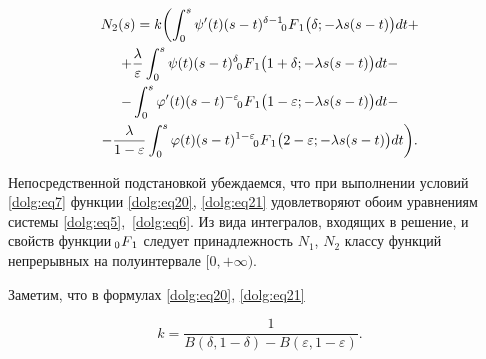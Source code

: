 \begin{multline}

N_2(s) = k\biggl( \int _0^s \psi'(t) (s-t)^{\delta-1}  \,\,

F_{\hspace{-4mm}0 \hspace{3mm}1} \bigl(\delta;-\lambda s (s-t)\bigr) dt +

\\

 + \frac{\lambda}{\varepsilon}

\int _0^s \psi(t) (s-t)^{\delta} 

 \,\,

F_{\hspace{-4mm}0 \hspace{3mm}1} \bigl(1+\delta;-\lambda s (s-t)\bigr) dt -

\\ - \int _0^s \varphi'(t) (s-t)^{-\varepsilon}  \,\,

F_{\hspace{-4mm}0 \hspace{3mm}1} \bigl(1-\varepsilon;-\lambda s (s-t)\bigr) dt -

\\

\label{dolg:eq21}

-  \frac{\lambda}{1-\varepsilon}

\int _0^s \varphi(t) (s-t)^{1-\varepsilon} \,\,

F_{\hspace{-4mm}0 \hspace{3mm}1} \bigl(2-\varepsilon;-\lambda s (s-t)\bigr) dt \biggr).

\end{multline}



Непосредственной подстановкой убеждаемся, что при выполнении условий \eqref{dolg:eq7} функции \eqref{dolg:eq20}, \eqref{dolg:eq21} удовлетворяют обоим уравнениям системы \eqref{dolg:eq5},~\eqref{dolg:eq6}. Из вида интегралов, входящих в решение, и свойств функции $ \,\,

F_{\hspace{-4mm}0 \hspace{3mm}1}$ следует принадлежность $N_1$, $N_2$ классу функций непрерывных на полуинтервале $[0,+\infty)$.

Заметим, что в формулах \eqref{dolg:eq20}, \eqref{dolg:eq21}

\begin{equation}\label{dolg:eq22}

k = \frac{1}{B(\delta, 1-\delta)- B(\varepsilon, 1-\varepsilon)}.

\end{equation}



